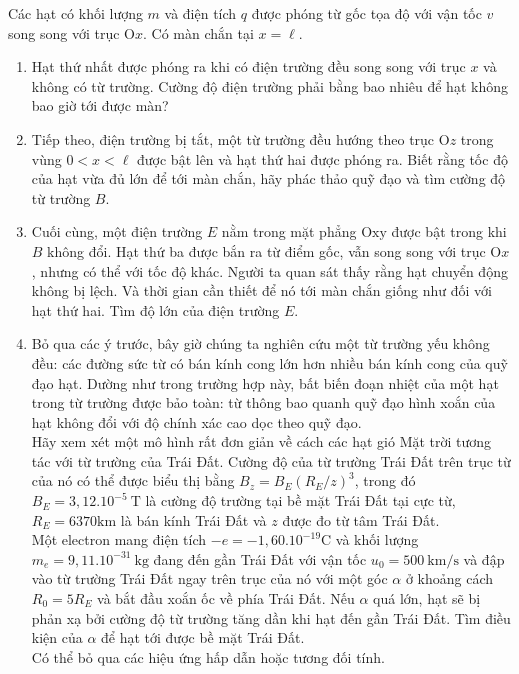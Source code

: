 \begin{vd}
 Các hạt có khối lượng $m$ và điện tích $q$ được phóng từ gốc tọa độ với vận tốc $v$ song song với trục $\mathrm{O}x$. Có màn chắn tại $x=\ell$.
    \begin{enumerate}[1)]
    \item Hạt thứ nhất được phóng ra khi có điện trường đều song song với trục $x$ và không có từ trường. Cường độ điện trường phải bằng bao nhiêu để hạt không bao giờ tới được màn?
    \item Tiếp theo, điện trường bị tắt, một từ trường đều hướng theo trục $\mathrm{O}z$ trong vùng $0<x<\ell$ được bật lên và hạt thứ hai được phóng ra. Biết rằng tốc độ của hạt vừa đủ lớn để tới màn chắn, hãy phác thảo quỹ đạo và tìm cường độ từ trường $B$.
    \item Cuối cùng, một điện trường $E$ nằm trong mặt phẳng $\mathrm{Oxy}$ được bật trong khi $B$ không đổi. Hạt thứ ba được bắn ra từ điểm gốc, vẫn song song với trục $\mathrm{O}x$, nhưng có thể với tốc độ khác. Người ta quan sát thấy rằng hạt chuyển động không bị lệch. Và thời gian cần thiết để nó tới màn chắn giống như đối với hạt thứ hai. Tìm độ lớn của điện trường $E$.
    \item Bỏ qua các ý trước, bây giờ chúng ta nghiên cứu một từ trường yếu không đều: các đường sức từ có bán kính cong lớn hơn nhiều bán kính cong của quỹ đạo hạt. Dường như trong trường hợp này, bất biến đoạn nhiệt của một hạt trong từ trường được bảo toàn: từ thông bao quanh quỹ đạo hình xoắn của hạt không đổi với độ chính xác cao dọc theo quỹ đạo. 
    \\Hãy xem xét một mô hình rất đơn giản về cách các hạt gió Mặt trời tương tác với từ trường của Trái Đất. Cường độ của từ trường Trái Đất trên trục từ của nó có thể được biểu thị bằng $B_z=B_E(R_E/z)^3$, trong đó $B_E = 3,12.10^{-5}~\mathrm{T}$ là cường độ trường tại bề mặt Trái Đất tại cực từ, $R_E = 6370 \mathrm{km}$ là bán kính Trái Đất và $z$ được đo từ tâm Trái Đất.
    \\Một electron mang điện tích $ -e = -1,60.10^{-19} \mathrm{C}$ và khối lượng $m_e = 9,11.10^{-31}~ \mathrm{kg}$ đang đến gần Trái Đất với vận tốc $u_0 = 500 ~\mathrm{km/s}$ và đập vào từ trường Trái Đất ngay trên trục của nó với một góc $\alpha$ ở khoảng cách $R_0 = 5R_E$ và bắt đầu xoắn ốc về phía Trái Đất. Nếu $\alpha$ quá lớn, hạt sẽ bị phản xạ bởi cường độ từ trường tăng dần khi hạt đến gần Trái Đất. Tìm điều kiện của $\alpha$ để hạt tới được bề mặt Trái Đất. 
    \\Có thể bỏ qua các hiệu ứng hấp dẫn hoặc tương đối tính. 
    \end{enumerate}
\end{vd}
